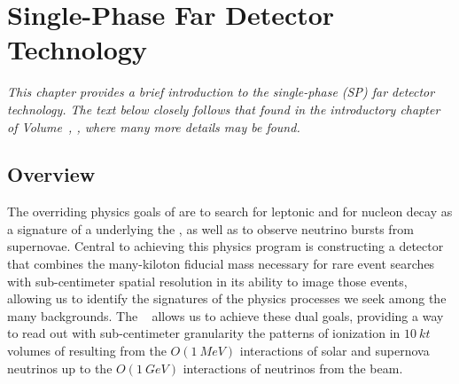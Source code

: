 \chapter{Single-Phase Far Detector Technology}
\label{ch:exec-sp}

\textit{This chapter provides a brief introduction to the single-phase (SP) far detector technology.  The text below closely follows that found in the introductory chapter of Volume~\volnumbersp{}, \voltitlesp{}, where many more details may be found.}

\section{Overview}
\label{sec:exec-sp-over}

The overriding physics goals of  are to search for leptonic  and for nucleon decay as a signature of a  underlying the , as well as to observe neutrino bursts from supernovae. Central to achieving this physics program is constructing a detector that combines the many-kiloton fiducial mass necessary for rare event searches with sub-centimeter spatial resolution in its ability to image those events, allowing us to identify the signatures of the physics processes we seek among the many backgrounds. The  ~\cite{Rubbia:1977zz} allows us to achieve these dual goals, providing a way to read out with sub-centimeter granularity the patterns of ionization in $\SI{10}{kt}$ volumes of  resulting from the $O(\SI{1}{MeV})$ interactions of solar and supernova neutrinos up to the $O(\SI{1}{GeV})$ interactions of neutrinos from the  beam.

